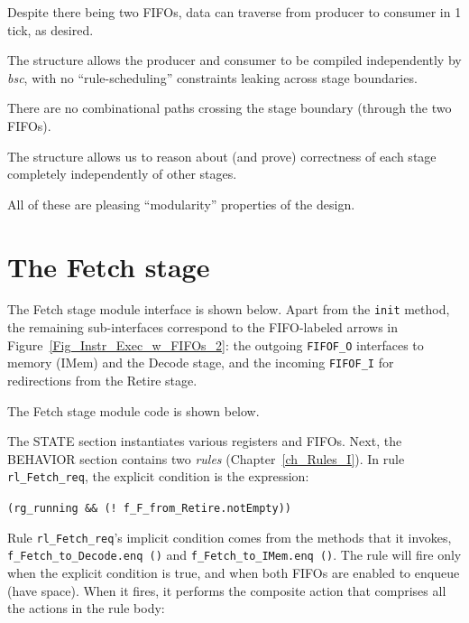 \begin{tightlist}

 \item Despite there being two FIFOs, data can traverse from producer
       to consumer in 1 tick, as desired.

 \item The structure allows the producer and consumer to be compiled
       independently by \emph{bsc}, with no ``rule-scheduling''
       constraints leaking across stage boundaries.

 \item There are no combinational paths crossing the stage boundary
       (through the two FIFOs).

 \item The structure allows us to reason about (and prove) correctness
       of each stage completely independently of other stages.

\end{tightlist}
All of these are pleasing ``modularity'' properties of the design.


\section{The Fetch stage}

\label{Sec_Fife_Fetch_stage}

The Fetch stage module interface is shown below.  Apart from the
\verb|init| method, the remaining sub-interfaces correspond to the
FIFO-labeled arrows in Figure~\ref{Fig_Instr_Exec_w_FIFOs_2}: the
outgoing \verb|FIFOF_O| interfaces to memory (IMem) and the Decode
stage, and the incoming \verb|FIFOF_I| for redirections from the
Retire stage.



The Fetch stage module code is shown below.



The STATE section instantiates various registers and FIFOs.  Next, the
BEHAVIOR section contains two \emph{rules} (Chapter~\ref{ch_Rules_I}).
In rule \verb|rl_Fetch_req|, the explicit condition is the expression:

\hm\small \verb|(rg_running && (! f_F_from_Retire.notEmpty))|

Rule \verb|rl_Fetch_req|'s implicit condition comes from the methods
that it invokes, \verb|f_Fetch_to_Decode.enq ()| and
\verb|f_Fetch_to_IMem.enq ()|.  The rule will fire only when the
explicit condition is true, and when both FIFOs are enabled to enqueue
(have space).  When it fires, it performs the composite action that
comprises all the actions in the rule body:


